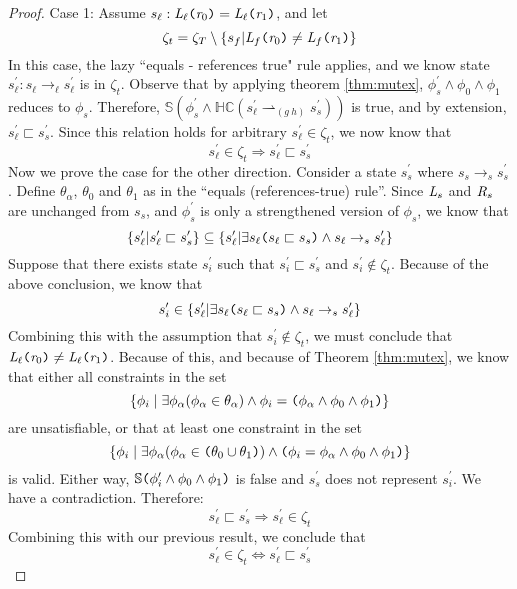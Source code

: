 \begin{proof}
Case 1: Assume $s_\ell : \emph{L}_\ell \texttt{(} \emph{r}_0\texttt{)} = \emph{L}_\ell \texttt{(} \emph{r}_1 \texttt{)}$, and let 
$$\zeta_t = \zeta_T \setminus \{ s_f | \emph{L}_f \texttt{(} \emph{r}_0\texttt{)} \neq \emph{L}_f \texttt{(} \emph{r}_1 \texttt{)} \}$$ In this case, the lazy ``equals - references true" rule applies, and we know state $s_\ell^\prime : s_\ell \rightarrow_\ell s_\ell^\prime$ is in $\zeta_t$. Observe that by applying theorem \ref{thm:mutex}, $\phi_s^\prime \wedge \phi_0 \wedge \phi_1$ reduces to $\phi_s$. Therefore, $\mathbb{S}( \phi_s^\prime \wedge \mathbb{HC}(s_\ell^\prime \rightharpoonup_{(g\ h)} s_s^\prime) ) $ is true, and by extension, $s_\ell^\prime \sqsubset s_s^\prime$. Since this relation holds for arbitrary $s_\ell^\prime \in \zeta_t$, we now know that $$s_\ell^\prime \in \zeta_t \Rightarrow s_\ell^\prime \sqsubset s_s^\prime$$
Now we prove the case for the other direction. Consider a state $s_s^\prime$ where  $s_s \rightarrow_s s_s^\prime$. Define $\theta_\alpha$, $\theta_0$ and $\theta_1$ as in the ``equals (references-true) rule''. Since $\emph{L}_s$ and $\emph{R}_s$ are unchanged from $s_s$, and $\phi_s^\prime$ is only a strengthened version of $\phi_s$,  we know that
$$\{s_\ell^\prime | s_\ell^\prime \sqsubset s_s^\prime \} \subseteq \{s_\ell^\prime | \exists s_\ell \texttt{(} s_\ell \sqsubset s_s \texttt{)} \wedge s_\ell \rightarrow_s s_\ell^\prime\} $$
Suppose that there exists state $s_i^\prime$ such that $s_i^\prime \sqsubset s_s^\prime$ and $s_i^\prime \notin \zeta_t$. Because of the above conclusion, we know that $$s_i^\prime \in \{s_\ell^\prime | \exists s_\ell \texttt{(} s_\ell \sqsubset s_s\texttt{)} \wedge s_\ell \rightarrow_s s_\ell^\prime\}$$ 
Combining this with the assumption that $s_i^\prime \notin \zeta_t$, we must conclude that $\emph{L}_\ell \texttt{(} \emph{r}_0\texttt{)} \neq  \emph{L}_\ell \texttt{(} \emph{r}_1 \texttt{)}$. Because of this, and because of Theorem \ref{thm:mutex}, we know that either all constraints in the set
$$\{\phi_i \mid \exists \phi_\alpha (\phi_\alpha \in \theta_\alpha)\wedge \phi_i = \texttt{(}\phi_\alpha \wedge \phi_0 \wedge \phi_1\texttt{)}\}$$ are unsatisfiable, or that at least one constraint in the set
$$\{\phi_i \mid \exists \phi_\alpha (\phi_\alpha \in \texttt{(} \theta_0 \cup \theta_1 \texttt{)})\wedge \texttt{(} \phi_i = \phi_\alpha \wedge \phi_0 \wedge \phi_1 \texttt{)}\}$$ 
is valid. Either way, $\mathbb{S}\texttt{(}\phi_i^\prime \wedge\phi_0\wedge \phi_1\texttt{)}$ is false and $s_s^\prime$ does not represent $s_i^\prime$. We have a contradiction. Therefore: $$s_\ell^\prime \sqsubset s_s^\prime \Rightarrow s_\ell^\prime \in \zeta_t$$
Combining this with our previous result, we conclude that $$s_\ell^\prime \in \zeta_t \Leftrightarrow s_\ell^\prime \sqsubset s_s^\prime$$


\end{proof}
